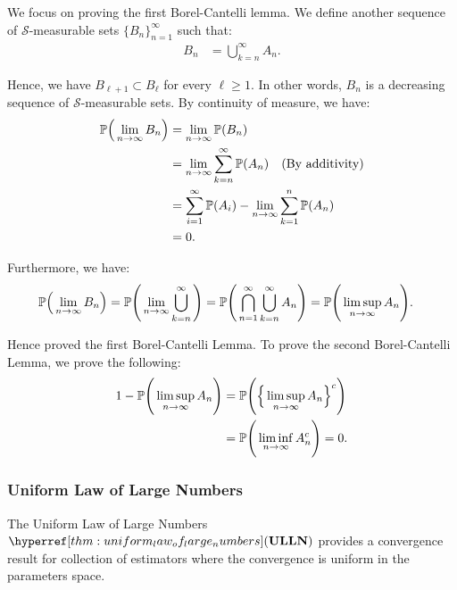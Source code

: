 \begin{proof*}
    We focus on proving the first Borel-Cantelli lemma. We define another sequence of $\mathcal{S}$-measurable sets $\{B_n\}_{n=1}^\infty$ such that:
    \begin{align*}
        B_n &= \bigcup_{k=n}^\infty A_n.
    \end{align*}

    \noindent Hence, we have $B_{\ell+1}\subset B_\ell$ for every $\ell\ge 1$. In other words, $B_n$ is a decreasing sequence of $\mathcal{S}$-measurable sets. By continuity of measure, we have:
    \begin{align*}
        \mathbb{P}\Big( \lim_{n\to\infty} B_n \Big) &= \lim_{n\to\infty} \mathbb{P}(B_n) \\
            &= \lim_{n\to\infty} \sum_{k=n}^\infty \mathbb{P}(A_n) \quad \text{(By additivity)} \\
            &= \sum_{i=1}^\infty\mathbb{P}(A_i) - \lim_{n\to\infty} \sum_{k=1}^n \mathbb{P}(A_n) \\
            &= 0.
    \end{align*}

    \noindent Furthermore, we have:
    \begin{align*}
        \mathbb{P}\Big( \lim_{n\to\infty} B_n \Big) &= \mathbb{P}\Bigg( \lim_{n\to\infty} \bigcup_{k=n}^\infty \Bigg) = \mathbb{P}\Bigg( \bigcap_{n=1}^\infty \bigcup_{k=n}^\infty A_n \Bigg) = \mathbb{P}\Bigg( \limsup_{n\to\infty} A_n \Bigg).
    \end{align*}

    \noindent Hence proved the first Borel-Cantelli Lemma. To prove the second Borel-Cantelli Lemma, we prove the following:
    \begin{align*}
        1 - \mathbb{P}\Bigg( \limsup_{n\to\infty} A_n \Bigg) &= \mathbb{P}\Bigg( \Big\{ \limsup_{n\to\infty} A_n \Big\}^c \Bigg) \\
        &= \mathbb{P}\Bigg( \liminf_{n\to\infty} A_n^c \Bigg) = 0.
    \end{align*}
\end{proof*}


\subsubsection{Uniform Law of Large Numbers}
The Uniform Law of Large Numbers $\ULLN$ provides a convergence result for collection of estimators where the convergence is uniform in the parameters space.

